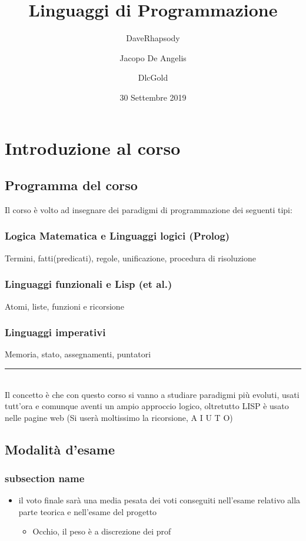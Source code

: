 \documentclass[12pt, a4paper, openany, oneside]{book}
\begin{document}
\author{DaveRhapsody \and Jacopo De Angelis \and DlcGold}
\title{Linguaggi di Programmazione}
\color{blue}
\date{30 Settembre 2019}
\color{black}
\maketitle
\tableofcontents
\chapter{Introduzione al corso}
\section{Programma del corso}
Il corso è volto ad insegnare dei paradigmi di programmazione dei seguenti tipi:
\subsection{Logica Matematica e Linguaggi logici (Prolog)}
Termini, fatti(predicati), regole, unificazione, procedura di risoluzione
\subsection{Linguaggi funzionali e Lisp (et al.)}
Atomi, liste, funzioni e ricorsione
\subsection{Linguaggi imperativi} %
\label{sub:linguaggi_imperativi}
Memoria, stato, assegnamenti, puntatori
\\ 
{\color{black} \rule{\linewidth}{0.3mm} }
\\
Il concetto è che con questo corso si vanno a studiare paradigmi più evoluti,
usati tutt'ora e comunque aventi un ampio approccio logico, oltretutto LISP è 
usato nelle pagine web (Si userà moltissimo la ricorsione, A I U T O)
\section{Modalità d'esame}
\label{sec:modalità_d_esame}
\subsection{subsection name}
\label{sub:subsection_name}
\begin{itemize}
	\item il voto finale sarà una media pesata dei voti conseguiti nell'esame relativo alla parte teorica e nell'esame del progetto 
	\begin{itemize}
		\item Occhio, il peso è a discrezione dei prof
	\end{itemize}
\end{itemize}
\end{document}
